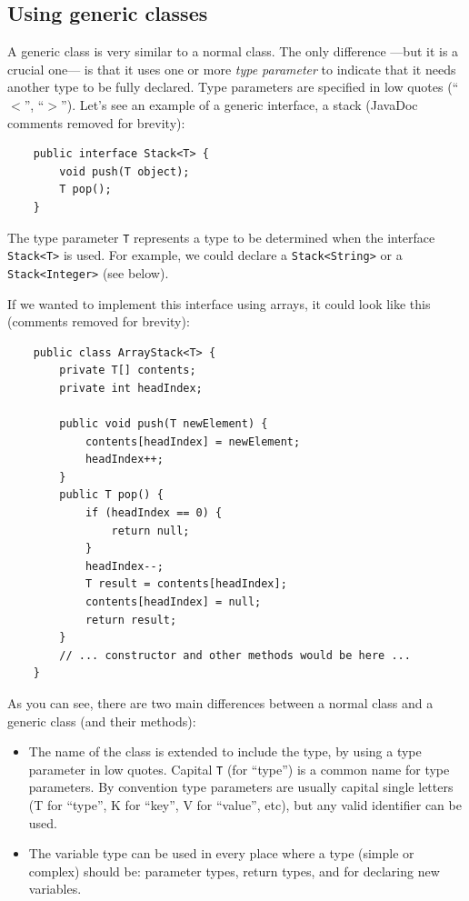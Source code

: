 \subsection{Using generic classes}
\label{sec:using-gener-class}

A generic class is very similar to a normal class. The only
difference ---but it is a crucial one--- is that it uses one or more
\emph{type parameter} to indicate that it needs another type to be
fully declared. Type parameters
are specified in low quotes (``$<$'', ``$>$''). Let's see an
example of a generic interface, a stack (JavaDoc comments removed for
brevity): 

\begin{verbatim}
    public interface Stack<T> {
        void push(T object);
        T pop();
    }
\end{verbatim}

The type parameter \verb+T+ represents a type to be determined when the
interface \verb+Stack<T>+ is used. For example, we could declare a
\verb+Stack<String>+ or a \verb+Stack<Integer>+ (see below). 

If we wanted to implement this interface using arrays, it could look
like this (comments removed for brevity): 

\begin{verbatim}
    public class ArrayStack<T> {
        private T[] contents;
        private int headIndex; 

        public void push(T newElement) {
            contents[headIndex] = newElement;
            headIndex++;
        }
        public T pop() {
            if (headIndex == 0) {
                return null;
            }
            headIndex--;
            T result = contents[headIndex];
            contents[headIndex] = null;
            return result;
        }
        // ... constructor and other methods would be here ...
    }
\end{verbatim}

As you can see, there are two main differences between a normal class
and a generic class (and their methods): 

\begin{itemize}
\item The name of the class is extended to include the type, by using
  a type parameter in low quotes. Capital \verb+T+ (for ``type'') is a common
  name for type parameters. By convention type parameters are
  usually capital single letters (T for ``type'', K for ``key'', 
  V for ``value'', etc), but any valid identifier can be
  used.
\item The variable type can be used in every place where a type
  (simple or complex) should be: parameter types, return types, and
  for declaring new variables. 
\end{itemize}


